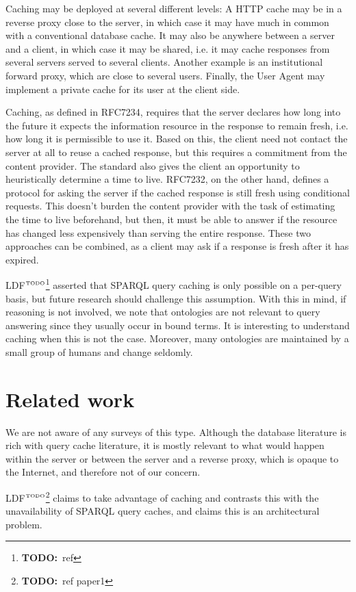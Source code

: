 \documentclass{article}
\newcommand{\todo}[1]{\ensuremath{^{\textrm{\tiny{TODO}\normalsize}}}\footnote{\textbf{TODO:}~#1}}
\begin{document}
Caching may be deployed at several different levels: A HTTP cache may
be in a reverse proxy close to the server, in which case it may have
much in common with a conventional database cache. It may also be
anywhere between a server and a client, in which case it may be
shared, i.e. it may cache responses from several servers served to
several clients. Another example is an institutional forward proxy,
which are close to several users. Finally, the User Agent may
implement a private cache for its user at the client side.

Caching, as defined in RFC7234, requires that the server declares how
long into the future it expects the information resource in the
response to remain fresh, i.e. how long it is permissible to use
it. Based on this, the client need not contact the server at all to
reuse a cached response, but this requires a commitment from the
content provider. The standard also gives the client an opportunity to
heuristically determine a time to live. RFC7232, on the other hand,
defines a protocol for asking the server if the cached response is
still fresh using conditional requests. This doesn't burden the
content provider with the task of estimating the time to live
beforehand, but then, it must be able to answer if the resource has
changed less expensively than serving the entire response. These two
approaches can be combined, as a client may ask if a response is fresh
after it has expired.

LDF\todo{ref} asserted that SPARQL query caching is only possible on a
per-query basis, but future research should challenge this
assumption. With this in mind, if reasoning is not involved, we note
that ontologies are not relevant to query answering since they usually
occur in bound terms. It is interesting to understand caching when
this is not the case. Moreover, many ontologies are maintained by a
small group of humans and change seldomly.

\section{Related work}

We are not aware of any surveys of this type. Although the database
literature is rich with query cache literature, it is mostly relevant
to what would happen within the server or between the server and a
reverse proxy, which is opaque to the Internet, and therefore not of
our concern.

LDF\todo{ref paper1} claims to take advantage of caching and contrasts
this with the unavailability of SPARQL query caches, and claims this is
an architectural problem.
\end{document}

